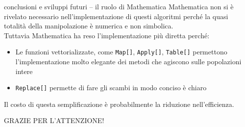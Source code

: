 \documentclass[10pt]{beamer}
\begin{document}
\begin{frame}{conclusioni e sviluppi futuri -- il ruolo di Mathematica}
	Mathematica \alert{non si è rivelato necessario} nell'implementazione di questi algoritmi perché la quasi totalità della manipolazione è numerica e non simbolica. \\
	Tuttavia Mathematica ha reso l'implementazione più diretta perché:
	\begin{itemize}
		\item Le funzioni vettorializzate, come \texttt{Map[]}, \texttt{Apply[]}, \texttt{Table[]} permettono l'implementazione molto elegante dei metodi che agiscono sulle popolazioni intere
		\item \texttt{Replace[]} permette di fare gli scambi in modo conciso è chiaro
	\end{itemize}
	Il costo di questa semplificazione è probabilmente la riduzione nell'efficienza.
	
\end{frame}

\begin{frame}[standout]
	GRAZIE PER L'ATTENZIONE!
\end{frame}
\end{document}
